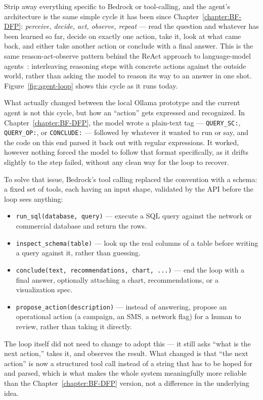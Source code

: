 Strip away everything specific to Bedrock or tool-calling, and the
agent's architecture is the same simple cycle it has been since
Chapter~\ref{chapter:BF-DFP}: \emph{perceive, decide, act, observe, repeat} --- read the
question and whatever has been learned so far, decide on exactly one
action, take it, look at what came back, and either take another action
or conclude with a final answer. This is the same reason-act-observe
pattern behind the ReAct approach to language-model agents~\cite{react}:
interleaving reasoning steps with concrete actions against the outside
world, rather than asking the model to reason its way to an answer in
one shot. Figure~\ref{fig:agent-loop} shows this cycle as it runs today.

What actually changed between the local Ollama prototype and the
current agent is not this cycle, but how an ``action'' gets expressed
and recognized. In Chapter~\ref{chapter:BF-DFP}, the model wrote a plain-text tag ---
\texttt{QUERY\_SC:}, \texttt{QUERY\_OP:}, or \texttt{CONCLUDE:} ---
followed by whatever it wanted to run or say, and the code on this end
parsed it back out with regular expressions. It worked, however nothing 
forced the model to follow that format specifically, as it drifts slightly to 
the step failed, without any clean way for the loop to recover.

To solve that issue, Bedrock's tool calling replaced the convention with a schema: a
fixed set of tools, each having an input shape, validated by the API before the loop sees anything:

\begin{itemize}
    \item \texttt{run\_sql(database, query)} --- execute a SQL query
    against the network or commercial database and return the rows.
    \item \texttt{inspect\_schema(table)} --- look up the real columns
    of a table before writing a query against it, rather than guessing.
    \item \texttt{conclude(text, recommendations, chart, ...)} --- end
    the loop with a final answer, optionally attaching a chart,
    recommendations, or a visualization spec.
    \item \texttt{propose\_action(description)} --- instead of
    answering, propose an operational action (a campaign, an SMS, a
    network flag) for a human to review, rather than taking it directly.
\end{itemize}

The loop itself did not need to change to adopt this --- it still asks
``what is the next action,'' takes it, and observes the result. What
changed is that ``the next action'' is now a structured tool call
instead of a string that has to be hoped for and parsed, which is what
makes the whole system meaningfully more reliable than the Chapter~\ref{chapter:BF-DFP}
version, not a difference in the underlying idea.


